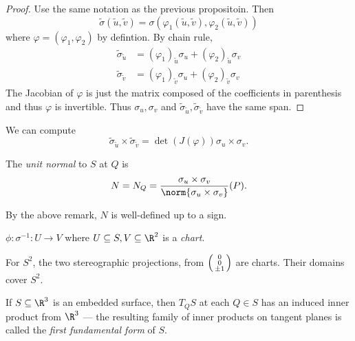 \documentclass[a4paper]{article}
\theoremstyle{definition}
\begin{document}
\begin{proof}
  Use the same notation as the previous propositoin. Then
  \[
    \tilde \sigma(\tilde u, \tilde v) = \sigma(\varphi_1(\tilde u, \tilde v), \varphi_2(\tilde u, \tilde v))
  \]
  where \(\varphi = (\varphi_1, \varphi_2)\) by defintion. By chain rule,
  \begin{align*}
    \tilde \sigma_{\tilde u} &= (\varphi_1)_{\tilde u} \sigma_u + (\varphi_2)_{\tilde u} \sigma_v \\
    \tilde \sigma_{\tilde v} &= (\varphi_1)_{\tilde v} \sigma_u + (\varphi_2)_{\tilde v} \sigma_v
  \end{align*}
  The Jacobian of \(\varphi\) is just the matrix composed of the coefficients in parenthesis and thus \(\varphi\) is invertible. Thus \(\sigma_u, \sigma_v\) and \(\tilde \sigma_{\tilde u}, \tilde \sigma_{\tilde v}\) have the same span.
\end{proof}

\begin{remark}
  We can compute
  \[
    \tilde \sigma_{\tilde u} \times \tilde \sigma_{\tilde v} = \det(J(\varphi)) \sigma_u \times \sigma_v.
  \]
\end{remark}

\begin{definition}
  The \emph{unit normal} to \(S\) at \(Q\) is
  \[
    N = N_Q = \frac{\sigma_u \times \sigma_v}{\norm{\sigma_u \times \sigma_v}}(P).
  \]
\end{definition}

By the above remark, \(N\) is well-defined up to a sign.

\begin{definition}[Chart]
  \(\phi: \sigma^{-1}: U \to V\) where \(U \subseteq S, V \subseteq \R^2\) is a \emph{chart}.
\end{definition}

\begin{eg}
  For \(S^2\), the two stereographic projections, from \(\begin{psmallmatrix} 0 \\ 0 \\ \pm 1 \end{psmallmatrix}\) are charts. Their domains cover \(S^2\).
\end{eg}

\begin{definition}
  If \(S \subseteq \R^3\) is an embedded surface, then \(T_QS\) at each \(Q \in S\) has an induced inner product from \(\R^3\) --- the resulting family of inner products on tangent planes is called the \emph{first fundamental form} of \(S\).
\end{definition}
\end{document}
